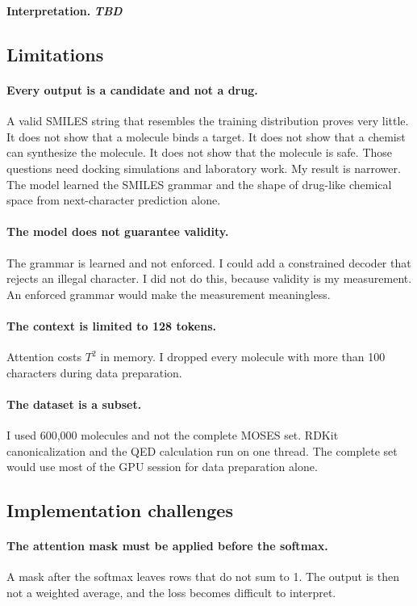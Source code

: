 \documentclass[11pt,a4paper]{article}
\newcommand{\tbd}{\textcolor{accent}{\textbf{\textit{TBD}}}}
\begin{document}
\noindent\textbf{Interpretation.} \tbd

\subsection{Limitations}

\paragraph{Every output is a candidate and not a drug.} A valid SMILES string that resembles the
training distribution proves very little. It does not show that a molecule binds a target. It does
not show that a chemist can synthesize the molecule. It does not show that the molecule is safe.
Those questions need docking simulations and laboratory work. My result is narrower. The model
learned the SMILES grammar and the shape of drug-like chemical space from next-character
prediction alone.

\paragraph{The model does not guarantee validity.} The grammar is learned and not enforced. I
could add a constrained decoder that rejects an illegal character. I did not do this, because
validity is my measurement. An enforced grammar would make the measurement meaningless.

\paragraph{The context is limited to 128 tokens.} Attention costs $T^{2}$ in memory. I dropped
every molecule with more than 100 characters during data preparation.

\paragraph{The dataset is a subset.} I used 600{,}000 molecules and not the complete MOSES set.
RDKit canonicalization and the QED calculation run on one thread. The complete set would use most
of the GPU session for data preparation alone.

\subsection{Implementation challenges}

\paragraph{The attention mask must be applied before the softmax.} A mask after the softmax leaves
rows that do not sum to 1. The output is then not a weighted average, and the loss becomes
difficult to interpret.
\end{document}
